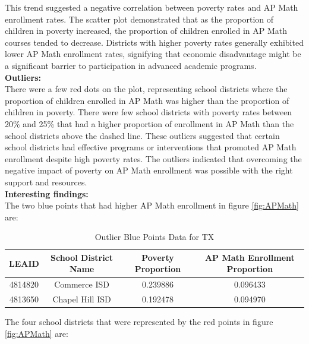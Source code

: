 \documentclass[sn-mathphys-num]{sn-jnl}%
\theoremstyle{thmstyleone}%
\theoremstyle{thmstyletwo}%
\theoremstyle{thmstylethree}%
\begin{document}
{This trend suggested a negative correlation between poverty rates and AP Math enrollment rates. The scatter plot demonstrated that as the proportion of children in poverty increased, the proportion of children enrolled in AP Math courses tended to decrease. Districts with higher poverty rates generally exhibited lower AP Math enrollment rates, signifying that economic disadvantage might be a significant barrier to participation in advanced academic programs.\\

\textbf{Outliers:}\\

There were a few red dots on the plot, representing school districts where the proportion of children enrolled in AP Math was higher than the proportion of children in poverty. There were few school districts with poverty rates between 20\% and 25\% that had a higher proportion of enrollment in AP Math than the school districts above the dashed line. These outliers suggested that certain school districts had effective programs or interventions that promoted AP Math enrollment despite high poverty rates. The outliers indicated that overcoming the negative impact of poverty on AP Math enrollment was possible with the right support and resources.\\

\textbf{Interesting findings:}\\

The two blue points that had higher AP Math enrollment in figure \ref{fig:APMath} are:\\

\begin{table}[h!]
\centering
\begin{tabular}{|c|c|c|c|}
\hline
\textbf{LEAID} & \textbf{School District Name} & \textbf{Poverty Proportion} & \textbf{AP Math Enrollment Proportion} \\
\hline
4814820 & Commerce ISD & 0.239886 & 0.096433 \\
\hline
4813650 & Chapel Hill ISD & 0.192478 & 0.094970 \\
\hline
\end{tabular}
\caption{Outlier Blue Points Data for TX}
\label{tab:blue_points}
\end{table}

The four school districts that were represented by the red points in figure \ref{fig:APMath} are:\\

}
\end{document}
